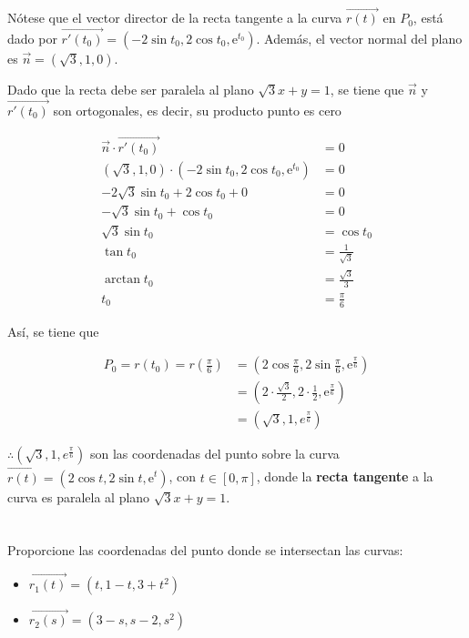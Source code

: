 \documentclass[12pt]{article}
\begin{document}
Nótese que el vector director de la recta tangente a la curva $\vec{r(t)}$ en $P_0$, está dado por $\vec{r'(t_0)}=(-2\sin{t_0},2\cos{t_0},\mathrm{e}^{ t_0})$. Además, el vector normal del plano es $\vec{n}=(\sqrt{3},1,0)$.

Dado que la recta debe ser paralela al plano $\sqrt{3}x+y=1$, se tiene que $\vec{n}$ y $\vec{r'(t_0)}$ son ortogonales, es decir, su producto punto es cero

\begin{align*}
   \vec{n} \cdot \vec{r'(t_0)} &= 0 \\
  (\sqrt{3},1,0) \cdot (-2\sin{t_0},2\cos{t_0},\mathrm{e}^{ t_0}) &=0 \\
  -2\sqrt{3}\sin{t_0} + 2\cos{t_0} + 0 &= 0 \\
  -\sqrt{3}\sin{t_0} + \cos{t_0} &= 0 \\
  \sqrt{3}\sin{t_0} &= \cos{t_0} \\
  \tan{t_0} &= \frac{1}{\sqrt{3}} \\
  \arctan{t_0} &= \frac{\sqrt{3}}{3}\\
  t_0 &= \frac{\pi}{6}
\end{align*}

Así, se tiene que

\begin{align*}
  P_0 = r(t_0) = r\left(\frac{\pi}{6}\right) &= \left(2\cos{\frac{\pi}{6}},2\sin{\frac{\pi}{6}},\mathrm{e}^{\frac{\pi}{6}}\right) \\
  &= \left(2\cdot \frac{\sqrt{3}}{2},2\cdot \frac{1}{2},\mathrm{e}^{\frac{\pi}{6}}\right) \\
  &= \left(\sqrt{3},1,e^{\frac{\pi}{6}}\right)
\end{align*}

$\therefore \left(\sqrt{3},1,e^{\frac{\pi}{6}}\right)$ son las coordenadas del punto sobre la curva $\vec{r(t)}=(2\cos{t},2\sin{t},\mathrm{e}^t)$, con $t \in [0,\pi]$, donde la \textbf{recta tangente} a la curva es paralela al plano $\sqrt{3}x+y=1$.

\section{}
Proporcione las coordenadas del punto donde se intersectan las curvas:
\begin{itemize}[format=\textbf]

\item $\vec{r_1(t)}=(t,1-t,3+t^2)$

\item $\vec{r_2(s)}=(3-s,s-2,s^2)$

\end{itemize}
\end{document}
